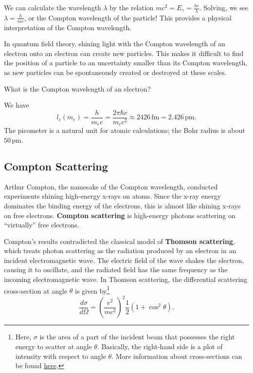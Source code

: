 We can calculate the wavelength $\lambda$ by the relation $mc^2=E_{\gamma}=\frac{hc}{\lambda}$. Solving, we see $\lambda=\frac{h}{mc}$, or the Compton wavelength of the particle! This provides a physical interpretation of the Compton wavelength.

\begin{framedrmk*}
    In quantum field theory, shining light with the Compton wavelength of an electron onto an electron can create new particles. This makes it difficult to find the position of a particle to an uncertainty smaller than its Compton wavelength, as new particles can be spontaneously created or destroyed at these scales.
\end{framedrmk*}

\begin{framedquest}
    What is the Compton wavelength of an electron?
\end{framedquest}

\begin{framedansw}
    We have $$l_c(m_e)=\frac{h}{m_ec}=\frac{2\pi\hbar c}{m_ec^2}\approx 2426\, \text{fm}=2.426\,\text{pm}.$$The picometer is a natural unit for atomic calculations; the Bohr radius is about $50\,\text{pm}$.
\end{framedansw}

\subsection{Compton Scattering}
\label{compton_scattering}

Arthur Compton, the namesake of the Compton wavelength, conducted experiments shining high-energy x-rays on atoms. Since the x-ray energy dominates the binding energy of the electrons, this is almost like shining x-rays on free electrons. \textbf{Compton scattering} is high-energy photons scattering on ``virtually'' free electrons. 

Compton's results contradicted the classical model of \textbf{Thomson scattering}, which treats photon scattering as the radiation produced by an electron in an incident electromagnetic wave. The electric field of the wave shakes the electron, causing it to oscillate, and the radiated field has the same frequency as the incoming electromagnetic wave. In Thomson scattering, the differential scattering cross-section at angle $\theta$ is given by\footnote{Here, $\sigma$ is the area of a part of the incident beam that possesses the right energy to scatter at angle $\theta$. Basically, the right-hand side is a plot of intensity with respect to angle $\theta$. More information about cross-sections can be found \href{https://www.sciencedirect.com/topics/engineering/scattering-cross-section}{here}.} $$\frac{d\sigma}{d\Omega}=(\frac{e^2}{mc^2})^2\frac{1}{2}(1+\cos^2\theta).$$

